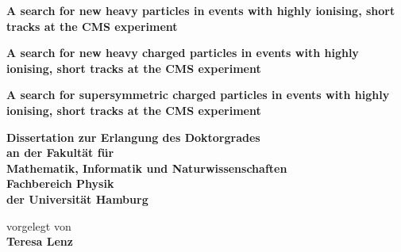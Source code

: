 \begin{titlepage}
   \begin{center}
     \thispagestyle{empty}
     \vspace*{0.1cm}
     \linespread{1.5}
       {\huge\bfseries A search for new heavy particles in events with highly ionising, short tracks at the CMS experiment\par}
       {\huge\bfseries A search for new heavy charged particles in events with highly ionising, short tracks at the CMS experiment\par}
       {\huge\bfseries A search for supersymmetric charged particles in events with highly ionising, short tracks at the CMS experiment\par}
       \begin{Large} 
         \textbf{Dissertation zur Erlangung des Doktorgrades\\
                 an der Fakult\"{a}t f\"{u}r\\
                 Mathematik, Informatik und Naturwissenschaften\\
                 Fachbereich Physik\\
                 der Universit\"{a}t Hamburg\\}
       \end{Large}
       \vskip2cm
       \begin{large}
         vorgelegt von\\
         {\bf Teresa Lenz}
         \vfill
       \end{large}
   \end{center}
 \end{titlepage}
 

